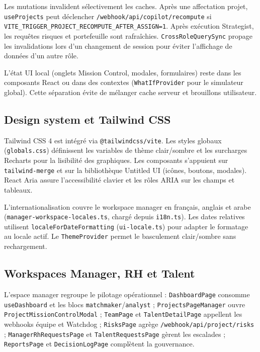 Les mutations invalident sélectivement les caches. Après une affectation projet, \texttt{useProjects} peut déclencher \texttt{/webhook/api/copilot/recompute} si \texttt{VITE\_TRIGGER\_PROJECT\_RECOMPUTE\_AFTER\_ASSIGN=1}. Après exécution Strategist, les requêtes risques et portefeuille sont rafraîchies. \texttt{CrossRoleQuerySync} propage les invalidations lors d'un changement de session pour éviter l'affichage de données d'un autre rôle.

L'état UI local (onglets Mission Control, modales, formulaires) reste dans les composants React ou dans des contextes (\texttt{WhatIfProvider} pour le simulateur global). Cette séparation évite de mélanger cache serveur et brouillons utilisateur.

\subsection{Design system et Tailwind CSS}

Tailwind CSS 4 est intégré via \texttt{@tailwindcss/vite}. Les styles globaux (\texttt{globals.css}) définissent les variables de thème clair/sombre et les surcharges Recharts pour la lisibilité des graphiques. Les composants s'appuient sur \texttt{tailwind-merge} et sur la bibliothèque Untitled UI (icônes, boutons, modales). React Aria assure l'accessibilité clavier et les rôles ARIA sur les champs et tableaux.

L'internationalisation couvre le workspace manager en français, anglais et arabe (\texttt{manager-workspace-locales.ts}, chargé depuis \texttt{i18n.ts}). Les dates relatives utilisent \texttt{localeForDateFormatting} (\texttt{ui-locale.ts}) pour adapter le formatage au locale actif. Le \texttt{ThemeProvider} permet le basculement clair/sombre sans rechargement.

\subsection{Workspaces Manager, RH et Talent}

L'espace manager regroupe le pilotage opérationnel : \texttt{DashboardPage} consomme \texttt{useDashboard} et les blocs \texttt{matchmaker}/\texttt{analyst} ; \texttt{ProjectsPageManager} ouvre \texttt{ProjectMissionControlModal} ; \texttt{TeamPage} et \texttt{TalentDetailPage} appellent les webhooks équipe et Watchdog ; \texttt{RisksPage} agrège \texttt{/webhook/api/project/risks} ; \texttt{ManagerRhRequestsPage} et \texttt{TalentRequestsPage} gèrent les escalades ; \texttt{ReportsPage} et \texttt{DecisionLogPage} complètent la gouvernance.

